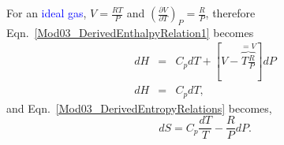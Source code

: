 \documentclass[12pts,a4paper,amsmath,amssymb,floatfix]{article}%
\newcommand{\frc}{\displaystyle\frac}
\newcommand{\blue}{\textcolor{blue}}
\newcommand{\Partial}[3][error]{\left(\frc{\partial #1}{\partial #2}\right)_{#3}}
\begin{document}
\medskip

\begin{shaded}
      \noindent
      For an \blue{ideal gas}, $V=\frac{RT}{P}$ and $\Partial[V]{T}{P} = \frc{R}{P}$, therefore Eqn.~\ref{Mod03_DerivedEnthalpyRelation1} becomes
         \begin{eqnarray}
            dH &=& C_{p}dT + \left[V-\overbrace{T\frc{R}{P}}^{=V}\right]dP \nonumber \\
            dH &=& C_{p}dT,\label{Mod03_DerivedEnthalpyRelation2}
         \end{eqnarray}
      and Eqn.~\ref{Mod03_DerivedEntropyRelations} becomes,
         \begin{equation}
            dS = C_{p}\frc{dT}{T} -\frc{R}{P}dP.\label{Mod03_DerivedEntropyRelations2}
         \end{equation}
\end{shaded}

\bigskip
\end{document}
